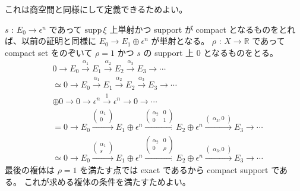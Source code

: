 \documentclass[dvipdfmx]{jsarticle}
\begin{document}
\begin{Proof}
\itemprof
  これは商空間と同様にして定義できるためよい。
\end{Proof}

\begin{Proof}
\itemprof
  \(s\) : \(E_0 \to \epsilon^n\) であって \(\text{supp} \, \xi\) 上単射かつ support が compact となるものをとれば、以前の証明と同様に \(E_0 \to E_1 \oplus \epsilon^n\) が単射となる。
  \(\rho\) : \(X \to \mathbb{R}\) であって compact set をのぞいて \(\rho = 1\) かつ \(s\) の support 上 \(0\) となるものをとる。
  \begin{align*}
    &0 \to E_0 \overset{\alpha_1}{\to} E_1 \overset{\alpha_2}{\to} E_2 \overset{\alpha_3}{\to} E_3 \to \cdots \\
    &\simeq 0 \to E_0 \overset{\alpha_1}{\to} E_1 \overset{\alpha_2}{\to} E_2 \overset{\alpha_3}{\to} E_3 \to \cdots \\
    &\oplus 0 \to 0 \to \epsilon^n \overset{1}{\to} \epsilon^n \to 0 \to \cdots \\
    &=0 \to E_0 \overset{
      \begin{pmatrix}
        \alpha_1 \\
        0
      \end{pmatrix}
    }{\to} E_1 \oplus \epsilon^n \overset{
      \begin{pmatrix}
        \alpha_2 & 0 \\
        0 & 1
      \end{pmatrix}
    }{\to} E_2 \oplus \epsilon^n \overset{
      \begin{pmatrix}
        \alpha_3 , 0
      \end{pmatrix}
    }{\to} E_3 \to \cdots \\
    &\simeq 0 \to E_0 \overset{
      \begin{pmatrix}
        \alpha_1 \\
        s
      \end{pmatrix}
    }{\to} E_1 \oplus \epsilon^n \overset{
      \begin{pmatrix}
        \alpha_2 & 0 \\
        0 & \rho
      \end{pmatrix}
    }{\to} E_2 \oplus \epsilon^n \overset{
      \begin{pmatrix}
        \alpha_3 , 0
      \end{pmatrix}
    }{\to} E_3 \to \cdots
  \end{align*}
  最後の複体は \(\rho = 1\) を満たす点では exact であるから compact support である。
  これが求める複体の条件を満たすためよい。
\end{Proof}
\end{document}
